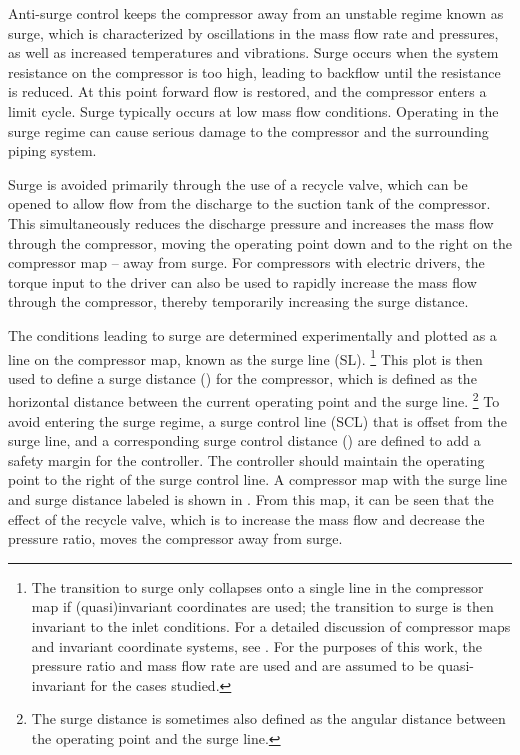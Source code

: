 Anti-surge control keeps the compressor away from an unstable regime known as surge, which is characterized by oscillations in the mass flow rate and pressures, as well as increased temperatures and vibrations.
Surge occurs when the system resistance on the compressor is too high, leading to backflow until the resistance is reduced.
At this point forward flow is restored, and the compressor enters a limit cycle.
Surge typically occurs at low mass flow conditions.
Operating in the surge regime can cause serious damage to the compressor and the surrounding piping system.

Surge is avoided primarily through the use of a recycle valve, which can be opened to allow flow from the discharge to the suction tank of the compressor.
This simultaneously reduces the discharge pressure and increases the mass flow through the compressor, moving the operating point down and to the right on the compressor map -- away from surge.
For compressors with electric drivers, the torque input to the driver can also be used to rapidly increase the mass flow through the compressor, thereby temporarily increasing the surge distance.

The conditions leading to surge are determined experimentally and plotted as a line on the compressor map, known as the surge line (SL).
\footnote{The transition to surge only collapses onto a single line in the compressor map if (quasi)invariant coordinates are used; the transition to surge is then invariant to the inlet conditions. 
For a detailed discussion of compressor maps and invariant coordinate systems, see \cite{Batson1996}.
For the purposes of this work, the pressure ratio and mass flow rate are used and are assumed to be quasi-invariant for the cases studied.}
This plot is then used to define a surge distance () for the compressor, which is defined as the horizontal distance between the current operating point and the surge line.
\footnote{The surge distance is sometimes also defined as the angular distance between the operating point and the surge line.}
To avoid entering the surge regime, a surge control line (SCL) that is offset from the surge line, and a corresponding surge control distance () are defined to add a safety margin for the controller.
The controller should maintain the operating point to the right of the surge control line.
A compressor map with the surge line and surge distance labeled is shown in .
From this map, it can be seen that the effect of the recycle valve, which is to increase the mass flow and decrease the pressure ratio, moves the compressor away from surge.

